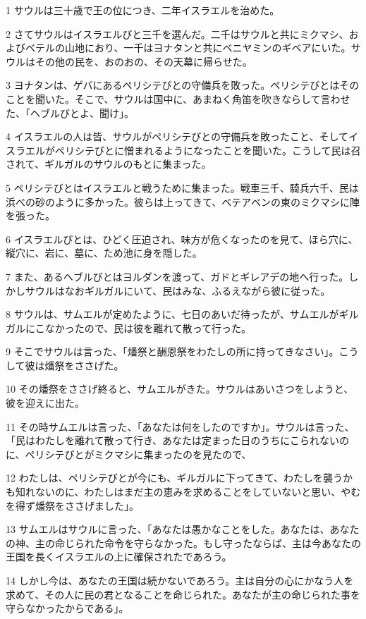 \par 1 サウルは三十歳で王の位につき、二年イスラエルを治めた。
\par 2 さてサウルはイスラエルびと三千を選んだ。二千はサウルと共にミクマシ、およびベテルの山地におり、一千はヨナタンと共にベニヤミンのギベアにいた。サウルはその他の民を、おのおの、その天幕に帰らせた。
\par 3 ヨナタンは、ゲバにあるペリシテびとの守備兵を敗った。ペリシテびとはそのことを聞いた。そこで、サウルは国中に、あまねく角笛を吹きならして言わせた、「ヘブルびとよ、聞け」。
\par 4 イスラエルの人は皆、サウルがペリシテびとの守備兵を敗ったこと、そしてイスラエルがペリシテびとに憎まれるようになったことを聞いた。こうして民は召されて、ギルガルのサウルのもとに集まった。
\par 5 ペリシテびとはイスラエルと戦うために集まった。戦車三千、騎兵六千、民は浜べの砂のように多かった。彼らは上ってきて、ベテアベンの東のミクマシに陣を張った。
\par 6 イスラエルびとは、ひどく圧迫され、味方が危くなったのを見て、ほら穴に、縦穴に、岩に、墓に、ため池に身を隠した。
\par 7 また、あるヘブルびとはヨルダンを渡って、ガドとギレアデの地へ行った。しかしサウルはなおギルガルにいて、民はみな、ふるえながら彼に従った。
\par 8 サウルは、サムエルが定めたように、七日のあいだ待ったが、サムエルがギルガルにこなかったので、民は彼を離れて散って行った。
\par 9 そこでサウルは言った、「燔祭と酬恩祭をわたしの所に持ってきなさい」。こうして彼は燔祭をささげた。
\par 10 その燔祭をささげ終ると、サムエルがきた。サウルはあいさつをしようと、彼を迎えに出た。
\par 11 その時サムエルは言った、「あなたは何をしたのですか」。サウルは言った、「民はわたしを離れて散って行き、あなたは定まった日のうちにこられないのに、ペリシテびとがミクマシに集まったのを見たので、
\par 12 わたしは、ペリシテびとが今にも、ギルガルに下ってきて、わたしを襲うかも知れないのに、わたしはまだ主の恵みを求めることをしていないと思い、やむを得ず燔祭をささげました」。
\par 13 サムエルはサウルに言った、「あなたは愚かなことをした。あなたは、あなたの神、主の命じられた命令を守らなかった。もし守ったならば、主は今あなたの王国を長くイスラエルの上に確保されたであろう。
\par 14 しかし今は、あなたの王国は続かないであろう。主は自分の心にかなう人を求めて、その人に民の君となることを命じられた。あなたが主の命じられた事を守らなかったからである」。
